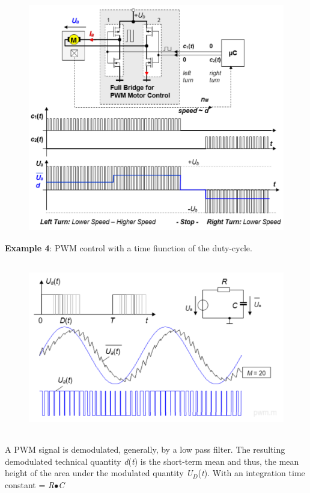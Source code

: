     \begin{figure}[h]
    \centering
    \includegraphics[width=15cm, height=10cm]{Images/image169.png}
    \label{fig:Fig 123}
    \end{figure}
\newpage

\textbf{ Example 4}:  PWM control with a time fiunction of the duty-cycle.

    \begin{figure}[h]
    \centering
    \includegraphics[width=14cm, height=7.5cm]{Images/image170.png}
    \label{fig:Fig 124}
    \end{figure}

A PWM signal is demodulated, generally, by a low pass filter. The resulting demodulated technical quantity \textit{d}(\textit{t}) is the short-term mean and thus, the mean height of the area under the modulated quantity \textit{U${}_{D}$}(\textit{t}). With an integration time constant  = \textit{R$\bullet$C} \\

